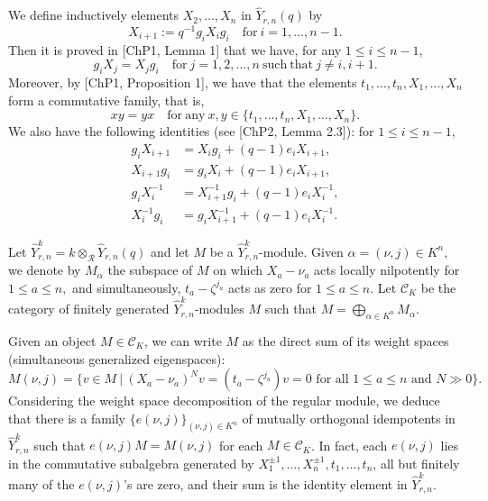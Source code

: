 \documentclass[11pt, reqno]{amsart} \textwidth=14.9cm \oddsidemargin=1cm \evensidemargin=1cm
\theoremstyle{definition}
\numberwithin{equation}{section}
\begin{document}
We define inductively elements $X_{2},\ldots,X_{n}$ in $\widehat{Y}_{r,n}(q)$ by
\begin{equation}
X_{i+1} :=q^{-1}g_{i}X_{i}g_{i}\quad\mathrm{for}~i=1,\ldots,n-1.\label{X2n}
\end{equation}
Then it is proved in [ChP1, Lemma 1] that we have, for any $1\leq i\leq n-1$,
\begin{equation}
g_{i}X_{j}=X_{j}g_{i}\quad\mathrm{for}~j=1,2,\ldots,n~\mathrm{such~that}~j\neq i, i+1.\label{giXj}
\end{equation}
Moreover, by [ChP1, Proposition 1], we have that the elements $t_{1},\ldots, t_{n}, X_{1},\ldots, X_{n}$ form a commutative family, that is,
\begin{equation}
xy=yx\quad\mathrm{for~any}~x,y\in \{t_{1},\ldots, t_{n}, X_{1},\ldots, X_{n}\}.\label{xyyx}
\end{equation}
We also have the following identities (see [ChP2, Lemma 2.3]): for $1\leq i\leq n-1$,
\begin{align}
g_{i}X_{i+1}&=X_{i}g_{i}+(q-1)e_{i}X_{i+1},\label{gxxg}\\
X_{i+1}g_{i}&=g_{i}X_{i}+(q-1)e_{i}X_{i+1},\label{gxxg1}\\
g_{i}X_{i}^{-1}&=X_{i+1}^{-1}g_{i}+(q-1)e_{i}X_{i}^{-1}, \label{gxxg2}\\
X_{i}^{-1}g_{i}&=g_{i}X_{i+1}^{-1}+(q-1)e_{i}X_{i}^{-1}.\label{gxxg3}
\end{align}

Let $\widehat{Y}_{r,n}^{k}=k\otimes_{\mathcal{R}}\widehat{Y}_{r,n}(q)$ and let $M$ be a $\widehat{Y}_{r,n}^{k}$-module. Given $\alpha=(\nu, j)\in K^{n},$ we denote by $M_{\alpha}$ the subspace of $M$ on which $X_{a}-\nu_{a}$ acts locally nilpotently for $1\leq a\leq n,$ and simultaneously, $t_{a}-\zeta^{j_{a}}$ acts as zero for $1\leq a\leq n.$ Let $\mathcal{C}_{K}$ be the category of finitely generated $\widehat{Y}_{r,n}^{k}$-modules $M$ such that $M=\bigoplus_{\alpha\in K^{n}}M_{\alpha}.$

Given an object $M\in \mathcal{C}_{K}$, we can write $M$ as the direct sum of its weight spaces (simultaneous generalized eigenspaces):
\begin{equation}
M(\nu, j)=\{v\in M\:|\:(X_{a}-\nu_{a})^{N}v=(t_{a}-\zeta^{j_{a}})v=0\text{ for all }1\leq a\leq n\text{ and }N\gg 0\}.\label{M-J}
\end{equation}
Considering the weight space decomposition of the regular module, we deduce that there is a family $\{e(\nu,j)\}_{(\nu,j)\in K^{n}}$ of mutually orthogonal idempotents in $\widehat{Y}_{r,n}^{k}$ such that $e(\nu,j)M=M(\nu, j)$ for each $M\in \mathcal{C}_{K}$. In fact, each $e(\nu, j)$ lies in the commutative subalgebra generated by $X_{1}^{\pm1},\ldots, X_{n}^{\pm1}, t_{1},\ldots,t_{n}$, all but finitely many of the $e(\nu, j)$'s are zero, and their sum is the identity element in $\widehat{Y}_{r,n}^{k}.$
\end{document}

